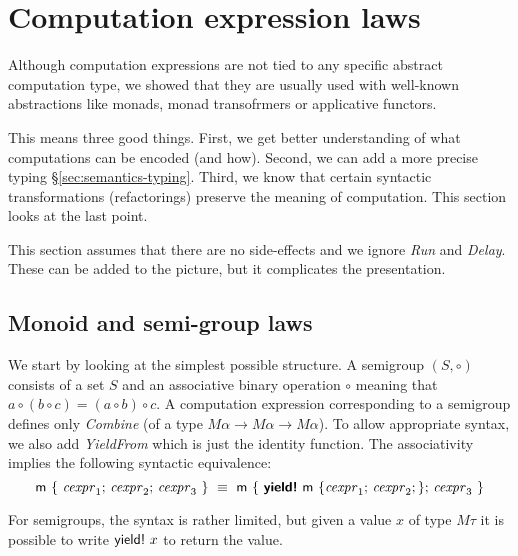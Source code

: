\documentclass[runningheads,a4paper]{llncs}
\begin{document}
\section{Computation expression laws}
\label{sec:laws}

Although computation expressions are not tied to any specific abstract computation type, we 
showed that they are usually used with well-known abstractions like monads, monad transofrmers or 
applicative functors. 

This means three good things. First, we get better understanding of what computations can be encoded
(and how). Second, we can add a more precise typing \S\ref{sec:semantics-typing}. Third, we know
that certain syntactic transformations (refactorings) preserve the meaning of computation. This
section looks at the last point. 

This section assumes that there are no side-effects and we ignore \emph{Run} and \emph{Delay}.
These can be added to the picture, but it complicates the presentation.


\subsection{Monoid and semi-group laws}
\label{sec:laws-monoids}

We start by looking at the simplest possible structure. A semigroup $(S, \circ)$ consists of a set
$S$ and an associative binary operation $\circ$ meaning that $a \circ (b \circ c) = (a \circ b) \circ c$.
A computation expression corresponding to a semigroup defines only \emph{Combine} (of a type
$M\alpha \rightarrow M\alpha \rightarrow M\alpha$). To allow appropriate syntax, we also add
\emph{YieldFrom} which is just the identity function. The associativity implies the following
syntactic equivalence:
%
\begin{equation*}
\textnormal{\sffamily m}~\{~\textnormal{\emph{cexpr}}_1; \,\textnormal{\emph{cexpr}}_2; \,\textnormal{\emph{cexpr}}_3 ~\} ~\equiv~
  \textnormal{\sffamily m}~\{~\textnormal{\bfseries\sffamily yield!}~\textnormal{\sffamily m}~\{ \textnormal{\emph{cexpr}}_1; \,\textnormal{\emph{cexpr}}_2; \}; \,\textnormal{\emph{cexpr}}_3 ~\}
\end{equation*}

\noindent
For semigroups, the syntax is rather limited, but given a value $x$ of type $M\tau$ it is possible
to write $\textnormal{\sffamily yield!}~x$ to return the value. 
\end{document}

